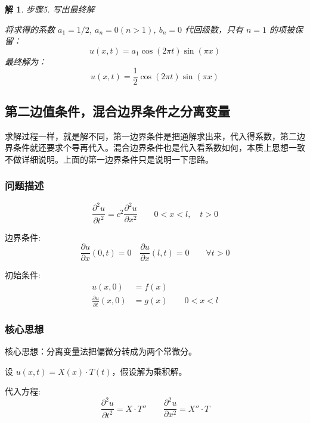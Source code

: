 \documentclass[12pt,a4paper]{article}
\numberwithin{subsection}{section}
\numberwithin{subsubsection}{subsection}
\theoremstyle{plain}
\newtheorem{solution}{解}[subsection]
\theoremstyle{definition}
\theoremstyle{remark}
\begin{document}
\begin{solution}
	步骤5. 写出最终解
		
		\noindent
		将求得的系数 $a_1=1/2$, $a_n=0 (n>1)$, $b_n=0$ 代回级数，只有 $n=1$ 的项被保留：
		\[
		u(x,t) = a_1 \cos(2\pi t) \sin(\pi x)
		\]
		最终解为：
		\[
		u(x,t) = \frac{1}{2}\cos(2\pi t)\sin(\pi x)
		\]
	\end{solution}
	
	
		\subsection{第二边值条件，混合边界条件之分离变量}
求解过程一样，就是解不同，第一边界条件是把通解求出来，代入得系数，第二边界条件就还要求个导再代入。混合边界条件也是代入看系数如何，本质上思想一致不做详细说明。上面的第一边界条件只是说明一下思路。
	\subsubsection{问题描述}
	\begin{equation} \label{eq:wave_equation_neumann}
		\frac{\partial^2 u}{\partial t^2} = c^2 \frac{\partial^2 u}{\partial x^2} \qquad 0 < x < l, \quad t > 0
	\end{equation}
	
	边界条件:
	\begin{equation} \label{eq:boundary_conditions_neumann}
		\frac{\partial u}{\partial x}(0, t) = 0 \quad \frac{\partial u}{\partial x}(l, t) = 0 \qquad \forall t > 0
	\end{equation}
	
	初始条件:
	\begin{equation} \label{eq:initial_conditions_neumann}
		\begin{aligned}
			u(x, 0) &= f(x) \\
			\frac{\partial u}{\partial t}(x, 0) &= g(x) \qquad 0 < x < l
		\end{aligned}
	\end{equation}
	
	\subsubsection{核心思想}
	核心思想：分离变量法把偏微分转成为两个常微分。
	
	设 \(u(x, t) = X(x) \cdot T(t)\)，假设解为乘积解。
	
	代入方程:
	\begin{equation} \label{eq:substitution_neumann}
		\frac{\partial^2 u}{\partial t^2} = X \cdot T'' \qquad \frac{\partial^2 u}{\partial x^2} = X'' \cdot T
	\end{equation}
	
\end{document}
